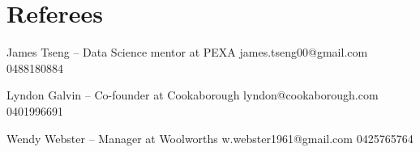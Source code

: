 \documentclass[a4paper,11pt]{article}
\makeatletter
\newcommand{\resumeItem}[1]{
\item\small{
    {#1 \vspace{-2pt}}
  }
}
\newcommand{\resumeProjectHeading}[2]{
    \vspace{-3pt}\item
    \begin{tabular*}{0.97\textwidth}{l@{\extracolsep{\fill}}r}
      \small#1 & #2 \\
    \end{tabular*}\vspace{5pt}
}
\newcommand{\resumeSubHeadingListStart}{\begin{itemize}[leftmargin=0.15in, label={}]}
\newcommand{\resumeSubHeadingListEnd}{\end{itemize}}
\newcommand{\resumeItemListStart}{\begin{itemize}}
\newcommand{\resumeItemListEnd}{\end{itemize}\vspace{-5pt}}
\makeatother
\begin{document}
      
      \iffalse



  
\section*{Awards}
    \resumeSubHeadingListStart
      \resumeProjectHeading          
          \resumeItemListStart
            \resumeItem{Dux for year 7, 8 and 9 at Forest Hill College (2012-2014)}
            \resumeItem{Principals Award, Year 9 at Forest Hill College (2014)}
            \resumeItem{Junior School Captain for Forest Hill College (2014)}
            \resumeItem{Australian Defence Force Long Tan Award (2015)}
            \resumeItem{Excellence in Mathematics, Science, Humanities, Physical Education (2015)}
            \resumeItem{Outstanding Leadership Award (2015)}
            \resumeItem{John Monash Science School Council student representative (2017)}
            \resumeItem{Subject excellence in Mathematical Methods and Chemistry (2017)}
            \resumeItem{3rd place in Monash University #HackForHire (2021)}
            \resumeItem{Offered CSP place for Masters of Data Science (2021)}
          \resumeItemListEnd
          

    \resumeSubHeadingListEnd
   




   

\section*{Technical Skills}
 \begin{itemize}[leftmargin=0.15in, label={}]
    \small{\item{
     \textbf{Languages}{: Python, SQL,  R} \\
    }}
 \end{itemize}
\fi


\section*{Referees}
James Tseng – Data Science mentor at PEXA
	james.tseng00@gmail.com 
	0488180884

Lyndon Galvin – Co-founder at Cookaborough
	lyndon@cookaborough.com
	0401996691


Wendy Webster – Manager at Woolworths
	w.webster1961@gmail.com
	0425765764


%
\iffalse
\end{document}
